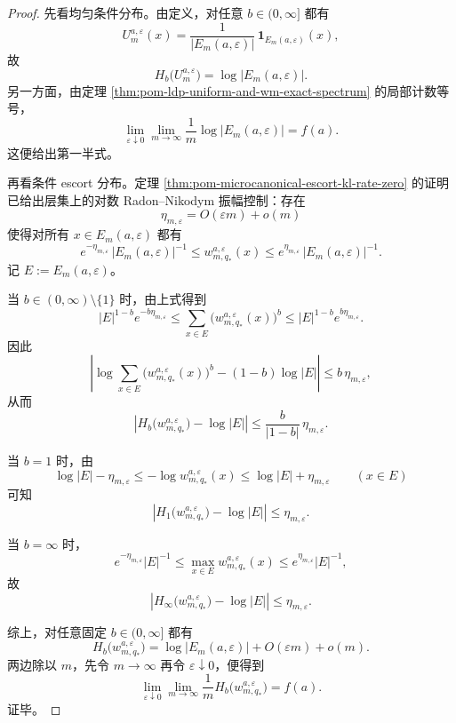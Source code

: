 \begin{proof}
先看均匀条件分布。由定义，对任意 \(b\in(0,\infty]\) 都有
\[
U_m^{a,\varepsilon}(x)=\frac{1}{|E_m(a,\varepsilon)|}\,\mathbf 1_{E_m(a,\varepsilon)}(x),
\]
故
\[
H_b\!\bigl(U_m^{a,\varepsilon}\bigr)=\log |E_m(a,\varepsilon)|.
\]
另一方面，由定理 \ref{thm:pom-ldp-uniform-and-wm-exact-spectrum} 的局部计数等号，
\[
\lim_{\varepsilon\downarrow 0}\lim_{m\to\infty}\frac{1}{m}\log |E_m(a,\varepsilon)|=f(a).
\]
这便给出第一半式。

再看条件 escort 分布。定理 \ref{thm:pom-microcanonical-escort-kl-rate-zero} 的证明已给出层集上的对数 Radon--Nikodym 振幅控制：存在
\[
\eta_{m,\varepsilon}=O(\varepsilon m)+o(m)
\]
使得对所有 \(x\in E_m(a,\varepsilon)\) 都有
\[
e^{-\eta_{m,\varepsilon}}\,|E_m(a,\varepsilon)|^{-1}
\le
w_{m,q_*}^{a,\varepsilon}(x)
\le
e^{\eta_{m,\varepsilon}}\,|E_m(a,\varepsilon)|^{-1}.
\]
记 \(E:=E_m(a,\varepsilon)\)。

当 \(b\in(0,\infty)\setminus\{1\}\) 时，由上式得到
\[
|E|^{1-b}e^{-b\eta_{m,\varepsilon}}
\le
\sum_{x\in E}\bigl(w_{m,q_*}^{a,\varepsilon}(x)\bigr)^b
\le
|E|^{1-b}e^{b\eta_{m,\varepsilon}}.
\]
因此
\[
\left|
\log\sum_{x\in E}\bigl(w_{m,q_*}^{a,\varepsilon}(x)\bigr)^b
-(1-b)\log|E|
\right|
\le
b\,\eta_{m,\varepsilon},
\]
从而
\[
\left|
H_b\!\bigl(w_{m,q_*}^{a,\varepsilon}\bigr)-\log|E|
\right|
\le
\frac{b}{|1-b|}\,\eta_{m,\varepsilon}.
\]

当 \(b=1\) 时，由
\[
\log|E|-\eta_{m,\varepsilon}
\le
-\log w_{m,q_*}^{a,\varepsilon}(x)
\le
\log|E|+\eta_{m,\varepsilon}
\qquad (x\in E)
\]
可知
\[
\left|
H_1\!\bigl(w_{m,q_*}^{a,\varepsilon}\bigr)-\log|E|
\right|
\le
\eta_{m,\varepsilon}.
\]

当 \(b=\infty\) 时，
\[
e^{-\eta_{m,\varepsilon}}|E|^{-1}
\le
\max_{x\in E}w_{m,q_*}^{a,\varepsilon}(x)
\le
e^{\eta_{m,\varepsilon}}|E|^{-1},
\]
故
\[
\left|
H_\infty\!\bigl(w_{m,q_*}^{a,\varepsilon}\bigr)-\log|E|
\right|
\le
\eta_{m,\varepsilon}.
\]

综上，对任意固定 \(b\in(0,\infty]\) 都有
\[
H_b\!\bigl(w_{m,q_*}^{a,\varepsilon}\bigr)
=
\log|E_m(a,\varepsilon)|+O(\varepsilon m)+o(m).
\]
两边除以 \(m\)，先令 \(m\to\infty\) 再令 \(\varepsilon\downarrow 0\)，便得到
\[
\lim_{\varepsilon\downarrow 0}\lim_{m\to\infty}\frac{1}{m}H_b\!\bigl(w_{m,q_*}^{a,\varepsilon}\bigr)=f(a).
\]
证毕。
\end{proof}

